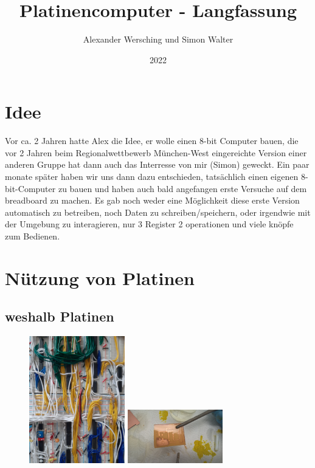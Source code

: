 \documentclass{scrartcl}
\begin{document}
    \title{Platinencomputer - Langfassung}
    \author{Alexander Wersching und Simon Walter}
    \date{2022}
    \maketitle

    \newpage
    \tableofcontents

    \section{Idee}


    Vor ca. 2 Jahren hatte Alex die Idee, er wolle einen 8-bit Computer bauen, die vor 2 Jahren beim Regionalwettbewerb München-West eingereichte Version einer anderen Gruppe hat dann auch das Interresse von mir (Simon) geweckt.
    Ein paar monate später haben wir uns dann dazu entschieden, tatsächlich einen eigenen 8-bit-Computer zu bauen und haben auch bald angefangen erste Versuche auf dem breadboard zu machen.
    Es gab noch weder eine Möglichkeit diese erste Version automatisch zu betreiben, noch Daten zu schreiben/speichern, oder irgendwie mit der Umgebung zu interagieren, nur 3 Register 2 operationen und viele knöpfe zum Bedienen.

    \newpage

    \section{Nützung von Platinen}
    \subsection{weshalb Platinen}

        \begin{figure}
        \vspace{-40pt}
        \begin{center}
        \includegraphics[width=0.37\textwidth]{Computer_V01_Chaos_07}
        \includegraphics[width=0.37\textwidth,angle=0]{Handy/WP_20210704_20_54_21_Pro}
        \end{center}
        \vspace{-30pt}
        \end{figure}
\end{document}
